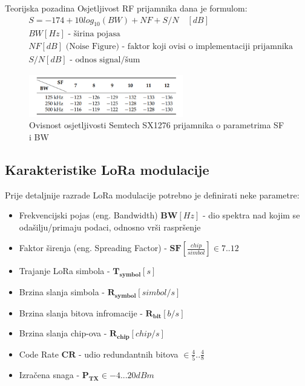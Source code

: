 \begin{subsubsection}{Teorijska pozadina}
Osjetljivost RF prijamnika dana je formulom:
\begin{equation}
\begin{aligned}
&S = -174 + 10log_{10}(BW) + NF + S/N \quad [dB]
\\
&BW[Hz] \text{ - širina pojasa}\\
&NF[dB] \text{ (Noise Figure) - faktor koji ovisi o implementaciji prijamnika} \\
&S/N[dB] \text{ - odnos signal/šum}
\end{aligned}
\end{equation}
\begin{figure}[ht!]
	\centering
	\includegraphics[width=0.6\textwidth]{images/sx1276.png}
	\caption{Ovisnost osjetljivosti Semtech SX1276 prijamnika o parametrima SF i BW}
	\label{img:sx1276sensitivity}
\end{figure}

\end{subsubsection}


\subsection{Karakteristike LoRa modulacije}
\label{subsection:lora_mod_params}

Prije detaljnije razrade LoRa modulacije potrebno je definirati neke parametre:
\begin{itemize}
\item Frekvencijski pojas (eng. Bandwidth) $\mathbf{BW} [Hz]$ - dio spektra nad kojim se odašilju/primaju podaci, odnosno vrši raspršenje
\item Faktor širenja (eng. Spreading Factor) - $\mathbf{SF} [\frac{chip}{simbol}] \in 7..12$
\item Trajanje LoRa simbola - $\mathbf{T_{symbol}} [s]$
\item Brzina slanja simbola - $\mathbf{R_{symbol}} [simbol/s]$
\item Brzina slanja bitova infromacije - $\mathbf{R_{bit}} [b/s]$
\item Brzina slanja chip-ova - $\mathbf{R_{chip}} [chip/s]$
\item Code Rate $\mathbf{CR}$ - udio redundantnih bitova $\in \frac{4}{5} .. \frac{4}{8} $
\item Izračena snaga - $\mathbf{P_{TX}} \in -4...20dBm$ 
\end{itemize}

